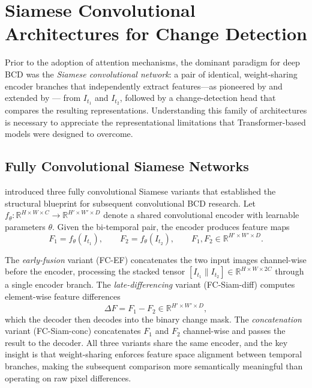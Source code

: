 \section{Siamese Convolutional Architectures for Change Detection}
\label{sec:siamese-conv}

Prior to the adoption of attention mechanisms, the dominant paradigm for deep
BCD was the \emph{Siamese convolutional network}: a pair of identical,
weight-sharing encoder branches that independently extract features---as
pioneered by \cite{Daudt2018SiamICIP} and extended by \cite{Yang2021DeepSiamese}---
from $I_{t_1}$ and $I_{t_2}$, followed by a change-detection head that compares
the resulting representations. Understanding this family of architectures is
necessary to appreciate the representational limitations that Transformer-based
models were designed to overcome.

\subsection{Fully Convolutional Siamese Networks}

\cite{Daudt2018SiamICIP} introduced three fully convolutional Siamese variants
that established the structural blueprint for subsequent convolutional BCD
research. Let $f_\theta: \mathbb{R}^{H \times W \times C} \to
\mathbb{R}^{H' \times W' \times D}$ denote a shared convolutional encoder
with learnable parameters $\theta$. Given the bi-temporal pair, the encoder
produces feature maps
\begin{equation}
F_1 = f_\theta(I_{t_1}), \qquad F_2 = f_\theta(I_{t_2}),
\qquad F_1, F_2 \in \mathbb{R}^{H' \times W' \times D}.
\label{eq:siamese_features}
\end{equation}

The \emph{early-fusion} variant (FC-EF) concatenates the two input images
channel-wise before the encoder, processing the stacked tensor
$[I_{t_1} \| I_{t_2}] \in \mathbb{R}^{H \times W \times 2C}$ through a
single encoder branch. The \emph{late-differencing} variant (FC-Siam-diff)
computes element-wise feature differences
\begin{equation}
\Delta F = F_1 - F_2 \in \mathbb{R}^{H' \times W' \times D},
\label{eq:feature_diff}
\end{equation}
which the decoder then decodes into the binary change mask. The
\emph{concatenation} variant (FC-Siam-conc) concatenates $F_1$ and $F_2$
channel-wise and passes the result to the decoder. All three variants share
the same encoder, and the key insight is that weight-sharing enforces feature
space alignment between temporal branches, making the subsequent comparison
more semantically meaningful than operating on raw pixel differences.

